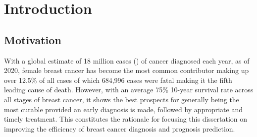\documentclass{l4proj}
\begin{document}
%
%
%
%
%
%
%
\chapter{Introduction}


\section{Motivation}
With a global estimate of 18 million cases (\cite{sung2021global}) of cancer diagnosed each year, as of 2020, female breast cancer has become the most common contributor making up over 12.5\% of all cases of which 684,996 cases were fatal making it the fifth leading cause of death. However, with an average 75\% 10-year survival rate across all stages of breast cancer, it shows the best prospects for generally being the most curable provided an early diagnosis is made, followed by appropriate and timely treatment. This constitutes the rationale for focusing this dissertation on improving the efficiency of breast cancer diagnosis and prognosis prediction. 
\end{document}
